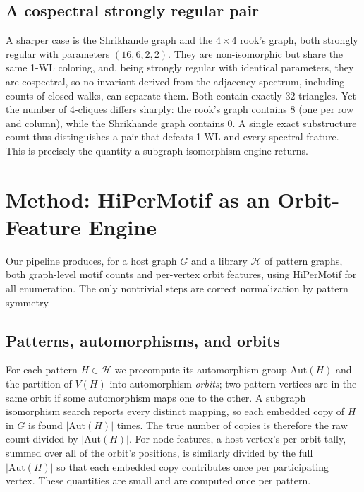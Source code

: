 \documentclass[conference]{IEEEtran}
\begin{document}
\subsection{A cospectral strongly regular pair}
A sharper case is the Shrikhande graph and the $4\times4$ rook's graph, both
strongly regular with parameters $(16,6,2,2)$. They are non-isomorphic but share
the same 1-WL coloring, and, being strongly regular with identical parameters, they
are cospectral, so no invariant derived from the adjacency spectrum, including
counts of closed walks, can separate them. Both contain exactly $32$ triangles.
Yet the number of 4-cliques differs sharply: the rook's graph contains $8$ (one per
row and column), while the Shrikhande graph contains $0$. A single exact
substructure count thus distinguishes a pair that defeats 1-WL and every spectral
feature. This is precisely the quantity a subgraph isomorphism engine returns.

\section{Method: HiPerMotif as an Orbit-Feature Engine}\label{sec:method}
Our pipeline produces, for a host graph $G$ and a library $\mathcal{H}$ of pattern
graphs, both graph-level motif counts and per-vertex orbit features, using
HiPerMotif for all enumeration. The only nontrivial steps are correct
normalization by pattern symmetry.

\subsection{Patterns, automorphisms, and orbits}
For each pattern $H\in\mathcal{H}$ we precompute its automorphism group
$\mathrm{Aut}(H)$ and the partition of $V(H)$ into automorphism \emph{orbits}; two
pattern vertices are in the same orbit if some automorphism maps one to the other.
A subgraph isomorphism search reports every distinct mapping, so each embedded copy
of $H$ in $G$ is found $|\mathrm{Aut}(H)|$ times. The true number of copies is
therefore the raw count divided by $|\mathrm{Aut}(H)|$. For node features, a host
vertex's per-orbit tally, summed over all of the orbit's positions, is similarly
divided by the full $|\mathrm{Aut}(H)|$ so that each embedded copy contributes once per
participating vertex. These quantities are small and are computed once per pattern.
\end{document}
